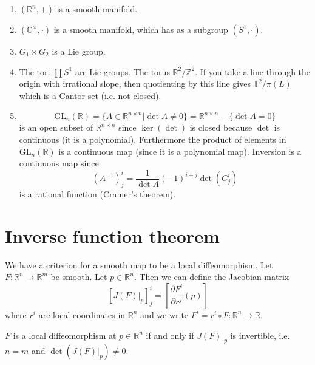 \begin{xmpl}
  \begin{enumerate}
    \item{
      $(\mathbb{R}^n, +)$ is a smooth manifold.
    }
    \item{
      $(\mathbb{C}^\times, \cdot)$ is a smooth manifold, which has as
      a subgroup $(S^1, \cdot)$.
    }
    \item{
      $G_1 \times G_2$ is a Lie group.
    }
    \item{
      The tori $\prod S^1$ are Lie groups.
      The torus $\mathbb{R}^2 / \mathbb{Z}^2$. If you take a line
      through the origin with irrational slope, then quotienting by
      this line gives $\mathbb{T}^2 / \pi(L)$ which is a Cantor set
      (i.e. not closed).
    }
    \item{
      $$
        \mathrm{GL}_n(\mathbb{R})
      = \{ A \in \mathbb{R}^{n \times n} \vert \det A \neq 0 \}
      = \mathbb{R}^{n \times n} - \{ \det A = 0 \}
      $$
      is an open subset of $\mathbb{R}^{n \times n}$ since
      $\ker(\det)$ is closed because $\det$ is continuous (it is a
      polynomial). Furthermore the product of elements in
      $\mathrm{GL}_n(\mathbb{R})$ is a continuous map (since it is a
      polynomial map). Inversion is a continuous map since
      $$
        (A^{-1})^i_j
      = \frac{1}{\det A} (-1)^{i + j} \det(C^i_j)
      $$
      is a rational function (Cramer's theorem).
    }
  \end{enumerate}
\end{xmpl}

\section{Inverse function theorem}
We have a criterion for a smooth map to be a local diffeomorphism.
Let $F : \mathbb{R}^n \to \mathbb{R}^m$ be smooth. Let $p \in
\mathbb{R}^n$. Then we can define the Jacobian matrix
$$
[J(F)|_p]^i_j = \left[\frac{\partial F^i}{\partial r^j}(p)\right]
$$
where $r^i$ are local coordinates in $\mathbb{R}^n$ and we
write $F^i = r^i \circ F : \mathbb{R}^n \to \mathbb{R}$.

\begin{theorem}
$F$ is a local diffeomorphism at $p \in \mathbb{R}^n$ if and only if
$J(F)|_p$ is invertible, i.e. $n = m$ and $\det(J(F)|_p) \neq 0$.
\end{theorem}

